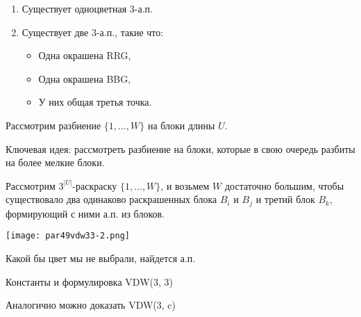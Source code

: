 \begin{normalsize}
\begin{lemma}
    \begin{enumerate}
        \item Существует одноцветная $3$-а.п.
        
        \item Существует две $3$-а.п., такие что:
        
        \begin{itemize}
            \item Одна окрашена RRG,
            
            \item Одна окрашена BBG,
            
            \item У них общая третья точка.
        \end{itemize}
    \end{enumerate}
\end{lemma}

Рассмотрим разбиение $\{ 1, \ldots, W \}$ на блоки длины $U$.

Ключевая идея: рассмотреть разбиение на блоки, которые в свою очередь разбиты на более мелкие блоки.

Рассмотрим $3^{|U|}$-раскраску $\{1, \ldots, W\}$, и возьмем $W$ достаточно большим, чтобы существовало два одинаково раскрашенных блока $B_i$ и $B_j$ и третий блок $B_k$, формирующий с ними а.п. из блоков.

\begin{center}
    \texttt{[image: par49vdw33-2.png]}
\end{center}

Какой бы цвет мы не выбрали, найдется а.п.

\end{normalsize}

\begin{exerc}
    Константы и формулировка VDW(3, 3)
\end{exerc}

\begin{notice}
    Аналогично можно доказать VDW(3, c)
\end{notice}